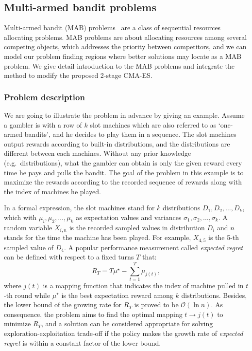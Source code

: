 \subsection{Multi-armed bandit problems}

Multi-armed bandit (MAB) problems~\cite{vermorel2005multi} are a class of sequential resources
allocating problems.
MAB problems are about allocating resources among several competing
objects, which addresses the priority between competitors, and
we can model our problem finding regions where better solutions may
locate as a MAB problem.
We give detail introduction to the MAB problems and
integrate the method to modify the proposed 2-stage CMA-ES.

\subsubsection{Problem description}

We are going to illustrate the problem in advance by giving an
example.
Assume a gambler is with a row of $k$ slot machines which are
also referred to as `one-armed bandits', and he decides to play them in
a sequence.
The slot machines output rewards according to built-in distributions,
and the distributions are different between each machines.
Without any prior knowledge (e.g.\ distributions), what the gambler can
obtain is only the given reward every time he pays and pulls the bandit.
The goal of the problem in this example is to maximize the rewards
according to the recorded sequence of rewards along with the index of
machines he played.

In a formal expression, the slot machines stand for $k$ distributions
$D_1, D_2, \ldots, D_k$, which with $\mu_i,\mu_2,\ldots,\mu_k$ as
expectation values and variances $\sigma_1, \sigma_2,\ldots,\sigma_k$.
A random variable $X_{i,n}$ is the recorded sampled values in
distribution $D_i$ and $n$ stands for the time the machine has been
played.
For example, $X_{4,5}$ is the 5-th sampled value of $D_4$.
A popular performance measurement called \emph{expected regret} can be
defined with respect to a fixed turns $T$ that: \[R_T = T\mu^\star -
\sum\limits_{t=1}^T \mu_{j(t)},\] where $j(t)$ is a mapping function
that indicates the index of machine pulled in $t$-th round while
$\mu^\star$ is the best expectation reward among $k$ distributions.
Besides, the lower bound of the growing rate for $R_T$ is proved to be
$\mathcal{O}(\ln{n})$.
As consequence, the problem aims to find the optimal mapping $t
\rightarrow j(t)$ to minimize $R_T$, and a solution can be considered
appropriate for solving exploration-exploitation trade-off if the policy
makes the growth rate of \emph{expected regret} is within a constant
factor of the lower bound.

